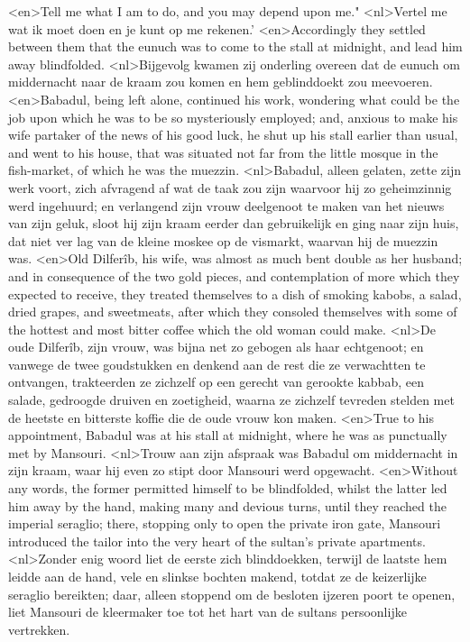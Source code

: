 <en>Tell me what I am to do, and you may depend upon me."
<nl>Vertel me wat ik moet doen en je kunt op me rekenen.'
<en>Accordingly they settled between them that the eunuch was to come to the stall at midnight, and lead him away blindfolded.
<nl>Bijgevolg kwamen  zij onderling overeen dat de eunuch om middernacht naar de kraam zou komen en hem geblinddoekt zou meevoeren.
<en>Babadul, being left alone, continued his work, wondering what could be the job upon which he was to be so mysteriously employed; and, anxious to make his wife partaker of the news of his good luck, he shut up his stall earlier than usual, and went to his house, that was situated not far from the little mosque in the fish-market, of which he was the muezzin.
<nl>Babadul, alleen gelaten, zette zijn werk voort, zich afvragend af wat de taak zou zijn waarvoor hij zo geheimzinnig werd ingehuurd; en verlangend  zijn vrouw deelgenoot te maken van het nieuws van zijn geluk, sloot hij zijn kraam eerder dan gebruikelijk en ging naar zijn huis, dat niet ver lag van de kleine moskee op de vismarkt, waarvan hij de muezzin was.
<en>Old Dilferîb, his wife, was almost as much bent double as her husband; and in consequence of the two gold pieces, and contemplation of more which they expected to receive, they treated themselves to a dish of smoking kabobs, a salad, dried grapes, and sweetmeats, after which they consoled themselves with some of the hottest and most bitter coffee which the old woman could make.
<nl>De oude Dilferîb, zijn vrouw, was bijna net zo gebogen als haar echtgenoot; en vanwege de twee goudstukken en denkend aan de rest die ze verwachtten te ontvangen, trakteerden ze zichzelf op een gerecht van gerookte kabbab, een salade, gedroogde druiven en zoetigheid, waarna ze zichzelf tevreden stelden met de heetste en bitterste koffie die de oude vrouw kon maken.
<en>True to his appointment, Babadul was at his stall at midnight, where he was as punctually met by Mansouri.
<nl>Trouw aan zijn afspraak was Babadul om middernacht in zijn kraam, waar hij even zo stipt  door Mansouri werd opgewacht.
<en>Without any words, the former permitted himself to be blindfolded, whilst the latter led him away by the hand, making many and devious turns, until they reached the imperial seraglio; there, stopping only to open the private iron gate, Mansouri introduced the tailor into the very heart of the sultan's private apartments.
<nl>Zonder  enig woord liet de eerste zich blinddoekken, terwijl de laatste hem  leidde aan de hand, vele en slinkse bochten makend, totdat ze de keizerlijke seraglio bereikten; daar, alleen stoppend om de besloten ijzeren poort te openen, liet Mansouri de kleermaker toe tot het hart van de sultans persoonlijke vertrekken.
